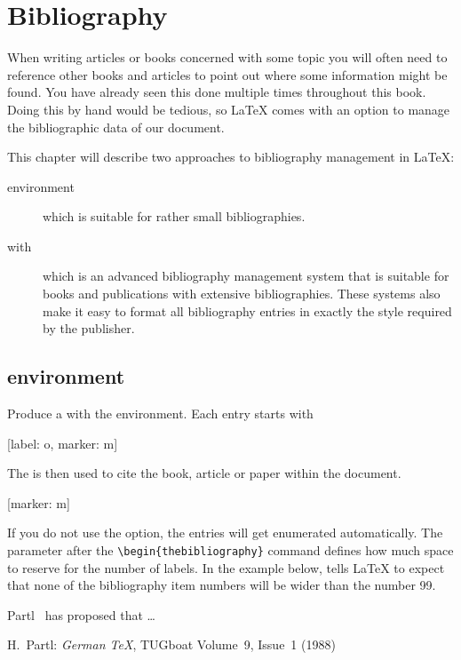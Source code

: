 \chapter{Bibliography}\label{chap:bibliography}
\begin{intro}
  When writing articles or books concerned with some topic you will often need
  to reference other books and articles to point out where some information
  might be found. You have already seen this done multiple times throughout
  this book. Doing this by hand would be tedious, so \LaTeX{} comes with an
  option to manage the bibliographic data of our document.
\end{intro}

This chapter will describe two approaches to bibliography management in \LaTeX{}:
\begin{description}
  \item[ environment] which is suitable for rather small
    bibliographies.
  \item[ with ] which is an advanced bibliography
    management system that is suitable for books and publications with extensive
    bibliographies. These systems also make it easy to format all bibliography
    entries in exactly the style required by the publisher.
\end{description}

\section{ environment}

Produce a  with the 
environment.  Each entry starts with
\begin{lscommand}
  [label: o, marker: m]
\end{lscommand}
The  is then used to cite the book, article or paper
within the document.
\begin{lscommand}
  [marker: m]
\end{lscommand}
If you do not use the  option, the entries will get enumerated
automatically.  The parameter after the \verb|\begin{thebibliography}|
command defines how much space to reserve for the number of labels. In the example below,
 tells \LaTeX{} to expect that none of the bibliography item numbers will be wider
than the number 99.
\begin{example}[standalone, paperwidth=6cm, paperheight=4cm]
Partl~\cite{pa} has
proposed that \ldots
\begin{thebibliography}{99}
 H.~Partl:
\emph{German \TeX},
TUGboat Volume~9, Issue~1 (1988)
\end{thebibliography}
\end{example}

